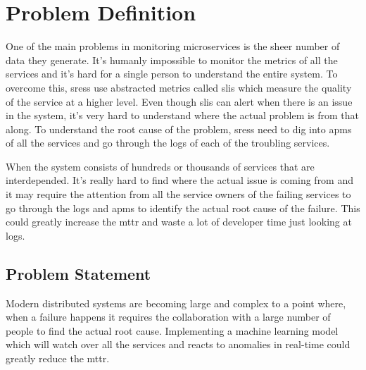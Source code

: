 \section{Problem Definition}

One of the main problems in monitoring microservices is the sheer number of data they generate. It's humanly impossible to monitor the metrics of all the services and it's hard for a single person to understand the entire system. To overcome this, \acp{sres} use abstracted metrics called \acp{sli} which measure the quality of the service at a higher level. Even though \acp{sli} can alert when there is an issue in the system, it's very hard to understand where the actual problem is from that along. To understand the root cause of the problem, \acp{sres} need to dig into \acp{apm} of all the services and go through the logs of each of the troubling services.

When the system consists of hundreds or thousands of services that are interdepended. It's really hard to find where the actual issue is coming from and it may require the attention from all the service owners of the failing services to go through the logs and \acp{apm} to identify the actual root cause of the failure. This could greatly increase the \ac{mttr} and waste a lot of developer time just looking at logs.

\subsection{Problem Statement}

Modern distributed systems are becoming large and complex to a point where, when a failure happens it requires the collaboration with a large number of people to find the actual root cause.  Implementing a machine learning model which will watch over all the services and reacts to anomalies in real-time could greatly reduce the \ac{mttr}.